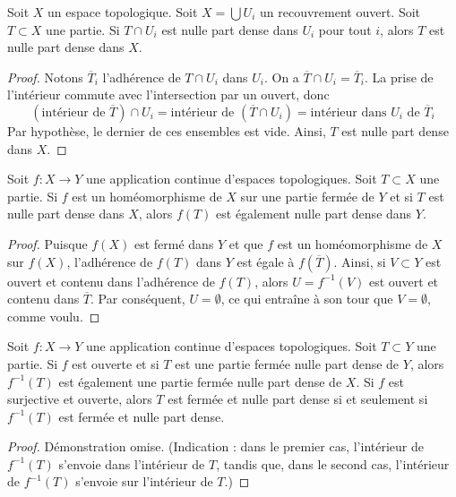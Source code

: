 \begin{lemma}
\label{lemma-nowhere-dense-local}
Soit $X$ un espace topologique.
Soit $X = \bigcup U_i$ un recouvrement ouvert.
Soit $T \subset X$ une partie.
Si $T \cap U_i$ est nulle part dense dans $U_i$ pour tout $i$,
alors $T$ est nulle part dense dans $X$.
\end{lemma}

\begin{proof}
Notons $\overline{T}_i$ l'adhérence de $T \cap U_i$ dans $U_i$.
On a $\overline{T} \cap U_i = \overline{T}_i$.
La prise de l'intérieur commute avec l'intersection par un ouvert, donc
$$
(\text{intérieur de }\overline{T}) \cap U_i =
\text{intérieur de }(\overline{T} \cap U_i) =
\text{intérieur dans }U_i\text{ de }\overline{T}_i
$$
Par hypothèse, le dernier de ces ensembles est vide. Ainsi,
$T$ est nulle part dense dans $X$.
\end{proof}

\begin{lemma}
\label{lemma-closed-image-nowhere-dense}
Soit $f : X \to Y$ une application continue d'espaces topologiques.
Soit $T \subset X$ une partie.
Si $f$ est un homéomorphisme de $X$ sur une partie fermée de $Y$
et si $T$ est nulle part dense dans $X$, alors $f(T)$ est également nulle
part dense dans $Y$.
\end{lemma}

\begin{proof}
Puisque $f(X)$ est fermé dans $Y$ et que $f$ est un homéomorphisme de $X$
sur $f(X)$, l'adhérence de $f(T)$ dans $Y$ est égale à $f(\overline{T})$.
Ainsi, si $V \subset Y$ est ouvert et contenu dans l'adhérence de $f(T)$,
alors $U = f^{-1}(V)$ est ouvert et contenu dans $\overline{T}$.
Par conséquent, $U = \emptyset$, ce qui entraîne à son tour que
$V = \emptyset$, comme voulu.
\end{proof}

\begin{lemma}
\label{lemma-open-inverse-image-closed-nowhere-dense}
Soit $f : X \to Y$ une application continue d'espaces topologiques.
Soit $T \subset Y$ une partie.
Si $f$ est ouverte et si $T$ est une partie fermée nulle part dense de $Y$,
alors $f^{-1}(T)$ est également une partie fermée nulle part dense de $X$.
Si $f$ est surjective et ouverte, alors
$T$ est fermée et nulle part dense si et seulement
si $f^{-1}(T)$ est fermée et nulle part dense.
\end{lemma}

\begin{proof}
Démonstration omise. (Indication : dans le premier cas, l'intérieur de
$f^{-1}(T)$ s'envoie dans l'intérieur de $T$, tandis que, dans le second cas,
l'intérieur de $f^{-1}(T)$ s'envoie sur l'intérieur de $T$.)
\end{proof}

